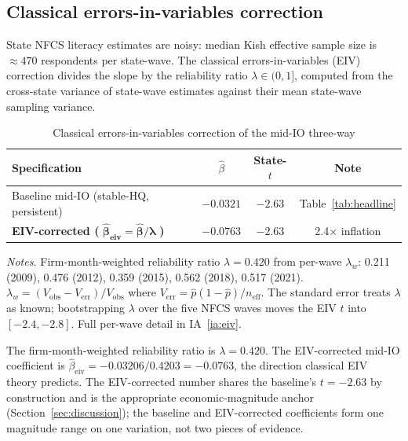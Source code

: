 \subsection{Classical errors-in-variables correction}
\label{sec:robust-eiv}

State NFCS literacy estimates are noisy: median Kish effective sample size is $\approx 470$ respondents per state-wave. The classical errors-in-variables (EIV) correction divides the slope by the reliability ratio $\lambda \in (0,1]$, computed from the cross-state variance of state-wave estimates against their mean state-wave sampling variance.

\begin{table}[t]
\centering
\caption{Classical errors-in-variables correction of the mid-IO three-way}
\label{tab:eiv}
\footnotesize
\begin{minipage}{\textwidth}
\centering
\begin{tabular}{lccc}
\toprule
Specification & $\hat\beta$ & State-$t$ & Note \\
\midrule
Baseline mid-IO (stable-HQ, persistent) & $-0.0321$ & $-2.63$ & Table~\ref{tab:headline} \\
\textbf{EIV-corrected (} $\boldsymbol{\hat\beta_{\text{eiv}} = \hat\beta / \lambda}$ \textbf{)} & $\mathbf{-0.0763}$ & $\mathbf{-2.63}$ & 2.4$\times$ inflation \\
\bottomrule
\end{tabular}
\end{minipage}

\medskip
{\footnotesize\textit{Notes.} Firm-month-weighted reliability ratio $\lambda = 0.420$ from per-wave $\lambda_{w}$: 0.211 (2009), 0.476 (2012), 0.359 (2015), 0.562 (2018), 0.517 (2021). $\lambda_{w} = (V_{\text{obs}} - V_{\text{err}})/V_{\text{obs}}$ where $V_{\text{err}} = \hat p(1-\hat p)/n_{\text{eff}}$. The standard error treats $\lambda$ as known; bootstrapping $\lambda$ over the five NFCS waves moves the EIV $t$ into $[-2.4, -2.8]$. Full per-wave detail in IA~\ref{ia:eiv}.}
\end{table}

The firm-month-weighted reliability ratio is $\lambda = 0.420$. The EIV-corrected mid-IO coefficient is $\hat\beta_{\text{eiv}} = -0.03206 / 0.4203 = -0.0763$, the direction classical EIV theory predicts. The EIV-corrected number shares the baseline's $t = -2.63$ by construction and is the appropriate economic-magnitude anchor (Section~\ref{sec:discussion}); the baseline and EIV-corrected coefficients form one magnitude range on one variation, not two pieces of evidence.

